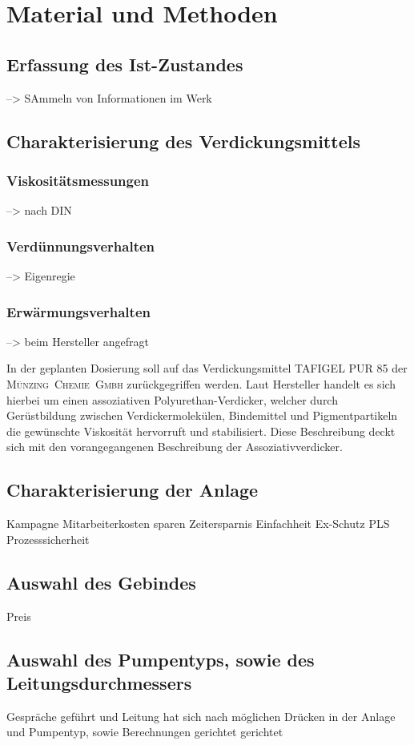 \section{Material und Methoden}
\label{sec:durchführung}

\subsection{Erfassung des Ist-Zustandes}
--> SAmmeln von Informationen im Werk

\subsection{Charakterisierung des Verdickungsmittels}

\subsubsection{Viskositätsmessungen}
--> nach DIN

\subsubsection{Verdünnungsverhalten}
--> Eigenregie

\subsubsection{Erwärmungsverhalten}

--> beim Hersteller angefragt

In der geplanten Dosierung soll auf das Verdickungsmittel TAFIGEL PUR 85 der \mbox{\textsc{Münzing Chemie Gmbh}} zurückgegriffen werden. Laut Hersteller handelt es sich hierbei um einen assoziativen Polyurethan-Verdicker, welcher durch Gerüstbildung zwischen Verdickermolekülen, Bindemittel und Pigmentpartikeln die gewünschte Viskosität hervorruft und stabilisiert. Diese Beschreibung deckt sich mit den vorangegangenen Beschreibung der Assoziativverdicker.\cite{MunzingChemieGmbH.2014}\\

\subsection{Charakterisierung der Anlage}

Kampagne
Mitarbeiterkosten sparen
Zeitersparnis
Einfachheit
Ex-Schutz
PLS
Prozesssicherheit

\subsection{Auswahl des Gebindes}
Preis

\subsection{Auswahl des Pumpentyps, sowie des Leitungsdurchmessers}
Gespräche geführt und Leitung hat sich nach möglichen Drücken in der Anlage und Pumpentyp, sowie Berechnungen gerichtet gerichtet